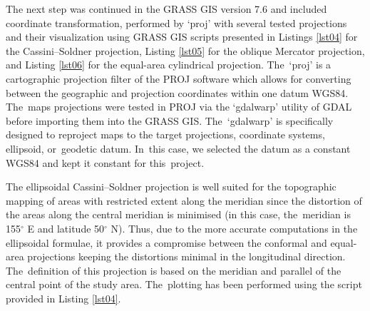 \documentclass[technologies,article,accept,pdftex,moreauthors]{Definitions/mdpi}
\begin{document}
The next step was continued in the GRASS GIS version 7.6 and included coordinate transformation, performed by ‘proj’ with several tested projections and their visualization using GRASS GIS scripts presented in Listings \ref{lst04} for the Cassini--Soldner projection, Listing \ref{lst05} for the oblique Mercator projection, and Listing \ref{lst06} for the equal-area cylindrical projection. The~‘proj’ is a cartographic projection filter of the PROJ software which allows for converting between the geographic and projection coordinates within one datum WGS84. The~maps projections were tested in PROJ via the ‘gdalwarp’ utility of GDAL before importing them into the GRASS GIS. The~‘gdalwarp’ is specifically designed to reproject maps to the target projections, coordinate systems, ellipsoid, or~geodetic datum. In~this case, we selected the datum as a constant WGS84 and kept it constant for this~project. 

{The ellipsoidal Cassini--Soldner projection is well suited for the topographic mapping of areas with restricted extent along the meridian since the distortion of the areas along the central meridian is minimised (in this case, the~meridian is} 155$^{\circ}$ E {and latitude} 50$^{\circ}$ {N). Thus, due to the more accurate computations in the ellipsoidal formulae, it provides a compromise between the conformal and equal-area projections keeping the distortions minimal in the longitudinal direction. %
	The~definition of this projection is based on the meridian and parallel of the central point of the study area. The~plotting has been performed using the script provided in Listing} \ref{lst04}.
\end{document}
